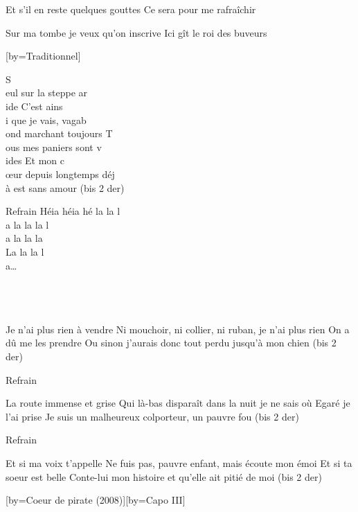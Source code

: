 \beginverse
Et s'il en reste quelques gouttes
Ce sera pour me rafraîchir
\\[bis]
\endverse

\beginverse
Sur ma tombe je veux qu'on inscrive
Ici gît le roi des buveurs
\\[bis]
\endverse

[by={Traditionnel}]

\beginverse
S\\[Mi]eul sur la steppe ar\\[Lam]ide
C'est ains\\[Mi]i que je vais, vagab\\[Lam]ond marchant toujours
T\\[Rém]ous mes paniers sont v\\[Lam]ides
Et mon c\\[Mi]œur depuis longtemps déj\\[Lam]à est sans amour
(bis 2 der)
\endverse

\beginverse
Refrain
Héia héia hé la la l\\[Mi]a la la la l\\[Lam]a la la la \\[bis]
La la la l\\[Rém]a… \\[Lam]\\[Mi]\\[Lam] \\[bis]
\endverse

\beginverse
Je n'ai plus rien à vendre
Ni mouchoir, ni collier, ni ruban, je n'ai plus rien
On a dû me les prendre
Ou sinon j'aurais donc tout perdu jusqu'à mon chien
(bis 2 der)
\endverse

	Refrain

\beginverse
La route immense et grise
Qui là-bas disparaît dans la nuit je ne sais où
Egaré je l'ai prise
Je suis un malheureux colporteur, un pauvre fou
(bis 2 der)
\endverse

	Refrain

\beginverse
Et si ma voix t'appelle
Ne fuis pas, pauvre enfant, mais écoute mon émoi
Et si ta soeur est belle
Conte-lui mon histoire et qu'elle ait pitié de moi
(bis 2 der)
\endverse

[by={Coeur de pirate (2008)}][by={Capo III}]

